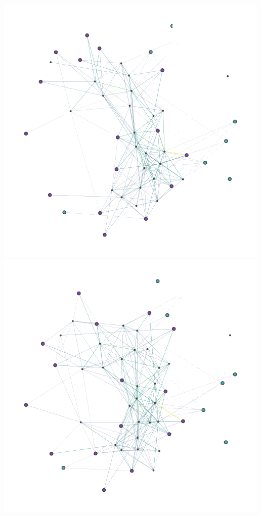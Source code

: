 \documentclass{article}
\begin{document}
\begin{multicols}{2}
	 \vspace{5pt}
	\begin{center}
	\includegraphics[scale=0.23]{figs/evolution-6}
	\includegraphics[scale=0.23]{figs/evolution-10}
	

\end{center}
\end{multicols}
\end{document}
